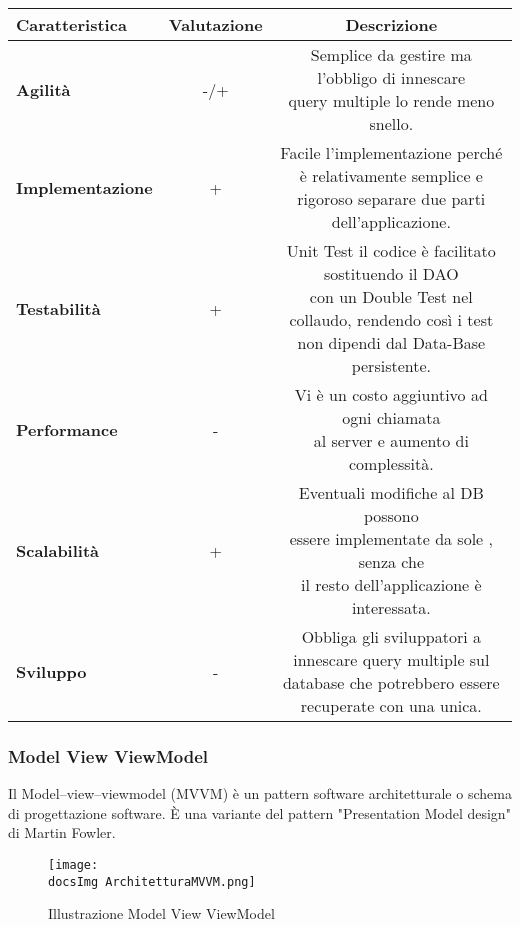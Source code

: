 {{{\begin{itemize}
				\small %
				{\renewcommand\arraystretch{1.2} %
					\begin{tabular}{|l|c|c|}
						\hline
						{\textbf{Caratteristica}}&{\textbf{Valutazione}}&{\textbf{Descrizione}}\\
						\hline
						\textbf{Agilità} & -/+ &  \minitab[c]{Semplice da gestire ma l'obbligo di innescare\\ query multiple lo rende meno snello.} \\
						\hline
						\textbf{Implementazione} & + &  \minitab[c]{Facile l'implementazione perché è relativamente semplice e\\ rigoroso separare due parti dell'applicazione.} \\
						\hline
						\textbf{Testabilità} & + & \minitab[c]{Unit Test il codice è facilitato sostituendo il DAO\\ con un Double Test nel collaudo, rendendo così i test\\ non dipendi dal Data-Base persistente.} \\
						\hline
						\textbf{Performance} & - &  \minitab[c]{Vi è un costo aggiuntivo ad ogni chiamata\\ al server e aumento di complessità.} \\
						\hline
						\textbf{Scalabilità} & + &  \minitab[c]{Eventuali modifiche al DB possono\\ essere implementate da sole , senza che\\ il resto dell'applicazione è interessata.} \\
						\hline
						\textbf{Sviluppo} & - &  \minitab[c]{Obbliga gli sviluppatori a innescare query multiple sul\\ database che potrebbero essere recuperate con una unica.} \\
						\hline
					\end{tabular}
				}
			\end{itemize}
		}
	
		\subsubsection{Model View ViewModel}{
			Il Model–view–viewmodel (MVVM) è un pattern software architetturale o schema di progettazione software. È una variante del pattern "Presentation Model design" di Martin Fowler.
			
			\begin{figure}[H]
				\centering
				\texttt{[image: \\docsImg ArchitetturaMVVM.png]}
				\caption{Illustrazione Model View ViewModel}
				\label{Illustrazione Model View ViewModel}
			\end{figure}
			
}}}
